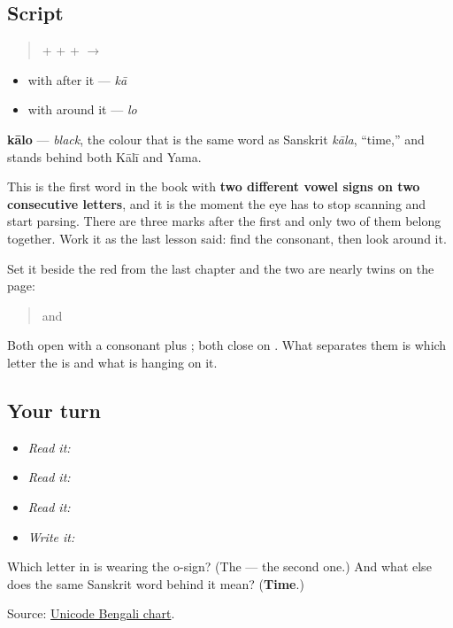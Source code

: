 \subsection*{Script}
\begin{quote}
\textbf{} + \textbf{} + \textbf{} + \textbf{} $\to$ \textbf{}
\end{quote}

\begin{itemize}
\raggedright
  \item \textbf{} with \textbf{} after it — \emph{kā}
  \item \textbf{} with \textbf{} around it — \emph{lo}
\end{itemize}

\textbf{kālo} — \emph{black}, the colour that is the same word as Sanskrit \emph{kāla}, \textquotedblleft{}time,\textquotedblright{} and stands behind both Kālī and Yama.

This is the first word in the book with \textbf{two different vowel signs on two consecutive letters}, and it is the moment the eye has to stop scanning and start parsing. There are three marks after the first \textbf{} and only two of them belong together. Work it as the last lesson said: find the consonant, then look around it.

Set it beside the red from the last chapter and the two are nearly twins on the page:

\begin{quote}
\textbf{} and \textbf{}
\end{quote}

Both open with a consonant plus \textbf{}; both close on \textbf{}. What separates them is which letter the \textbf{} is and what is hanging on it.

\subsection*{Your turn}
\begin{itemize}
\raggedright
  \item \emph{Read it:} 
  \item \emph{Read it:} 
  \item \emph{Read it:} 
  \item \emph{Write it:} 
\end{itemize}

\begin{tcolorbox}[breakable,colback=teal!4,colframe=teal!35!black,title={Before you move on}]
Which letter in \textbf{} is wearing the o-sign? (The \textbf{} — the second one.) And what else does the same Sanskrit word behind it mean? (\textbf{Time}.)

Source: \href{https://www.unicode.org/charts/PDF/U0980.pdf}{Unicode Bengali chart}.
\end{tcolorbox}
